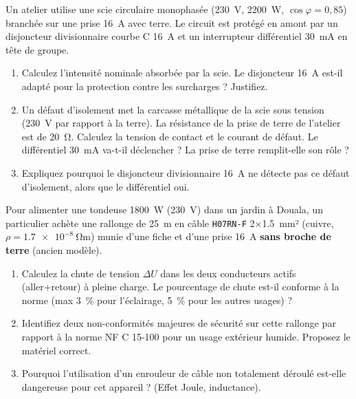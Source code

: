 \documentclass[11pt]{article}
\begin{document}
\begin{exercice}
Un atelier utilise une scie circulaire monophasée (\SI{230}{V}, \SI{2200}{W}, $\cos\varphi = 0,85$) branchée sur une prise \SI{16}{A} avec terre. Le circuit est protégé en amont par un disjoncteur divisionnaire courbe C \SI{16}{A} et un interrupteur différentiel \SI{30}{mA} en tête de groupe.
\begin{enumerate}
    \item[2 pts] Calculez l'intensité nominale absorbée par la scie. Le disjoncteur \SI{16}{A} est-il adapté pour la protection contre les surcharges ? Justifiez.
    \item[2 pts] Un défaut d'isolement met la carcasse métallique de la scie sous tension (\SI{230}{V} par rapport à la terre). La résistance de la prise de terre de l'atelier est de \SI{20}{\ohm}. Calculez la tension de contact et le courant de défaut. Le différentiel \SI{30}{mA} va-t-il déclencher ? La prise de terre remplit-elle son rôle ?
    \item[2 pts] Expliquez pourquoi le disjoncteur divisionnaire \SI{16}{A} ne détecte pas ce défaut d'isolement, alors que le différentiel oui.
\end{enumerate}
\end{exercice}

\begin{exercice}
Pour alimenter une tondeuse \SI{1800}{W} (\SI{230}{V}) dans un jardin à Douala, un particulier achète une rallonge de \SI{25}{m} en câble \texttt{H07RN-F} 2$\times$\SI{1,5}{mm²} (cuivre, $\rho = \SI{1,7e-8}{\ohm\meter}$) munie d'une fiche et d'une prise \SI{16}{A} \textbf{sans broche de terre} (ancien modèle).
\begin{enumerate}
    \item[2 pts] Calculez la chute de tension $\Delta U$ dans les deux conducteurs actifs (aller+retour) à pleine charge. Le pourcentage de chute est-il conforme à la norme (max \SI{3}{\%} pour l'éclairage, \SI{5}{\%} pour les autres usages) ?
    \item[2 pts] Identifiez deux non-conformités majeures de sécurité sur cette rallonge par rapport à la norme NF C 15-100 pour un usage extérieur humide. Proposez le matériel correct.
    \item[2 pts] Pourquoi l'utilisation d'un enrouleur de câble non totalement déroulé est-elle dangereuse pour cet appareil ? (Effet Joule, inductance).
\end{enumerate}
\end{exercice}
\end{document}
